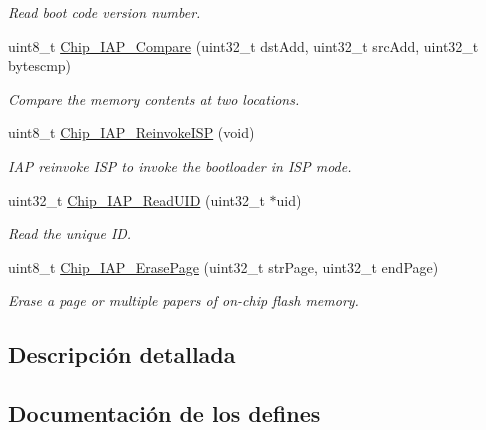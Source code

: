 \begin{DoxyCompactItemize}
\begin{DoxyCompactList}\small\item\em Read boot code version number. \end{DoxyCompactList}\item 
uint8\+\_\+t \hyperlink{group___c_o_m_m_o_n___i_a_p_ga0f3983319210f99d1931f1e9fa762d9e}{Chip\+\_\+\+I\+A\+P\+\_\+\+Compare} (uint32\+\_\+t dst\+Add, uint32\+\_\+t src\+Add, uint32\+\_\+t bytescmp)
\begin{DoxyCompactList}\small\item\em Compare the memory contents at two locations. \end{DoxyCompactList}\item 
uint8\+\_\+t \hyperlink{group___c_o_m_m_o_n___i_a_p_ga91a6ef5cac3a052f637cf0b5d7d31d53}{Chip\+\_\+\+I\+A\+P\+\_\+\+Reinvoke\+I\+SP} (void)
\begin{DoxyCompactList}\small\item\em I\+AP reinvoke I\+SP to invoke the bootloader in I\+SP mode. \end{DoxyCompactList}\item 
uint32\+\_\+t \hyperlink{group___c_o_m_m_o_n___i_a_p_gadf10e245b3a9c4713598cce332b52414}{Chip\+\_\+\+I\+A\+P\+\_\+\+Read\+U\+ID} (uint32\+\_\+t $\ast$uid)
\begin{DoxyCompactList}\small\item\em Read the unique ID. \end{DoxyCompactList}\item 
uint8\+\_\+t \hyperlink{group___c_o_m_m_o_n___i_a_p_ga95ca28fb39884184657054e134671f95}{Chip\+\_\+\+I\+A\+P\+\_\+\+Erase\+Page} (uint32\+\_\+t str\+Page, uint32\+\_\+t end\+Page)
\begin{DoxyCompactList}\small\item\em Erase a page or multiple papers of on-\/chip flash memory. \end{DoxyCompactList}\end{DoxyCompactItemize}


\subsection{Descripción detallada}


\subsection{Documentación de los \textquotesingle{}defines\textquotesingle{}}
